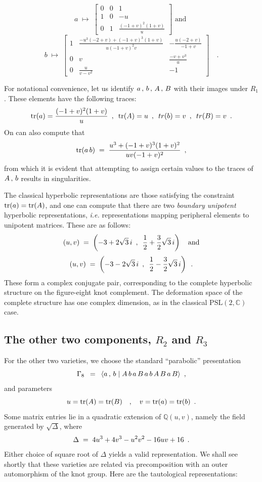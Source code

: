 \[
a \;\mapsto\; \left[\begin{array}{ccc}0&0&1\\1&0&-u\\0&1&\frac{(-1+v)^2(1+v)}{u}\end{array}\right] \textrm{ and }\]
\[b\;\mapsto\; \left[\begin{array}{ccc}1&
\frac{-u^3(-2+v)+(-1+v)^3(1+v)}{u(-1+v)^2v}&
-\frac{u(-2+v)}{-1+v}\\
0&v&
\frac{-v+v^3}{u}\\
0&
\frac{u}{v-v^2}&
-1\end{array}\right] \quad. \]

For notational convenience, let us identify $a \,,\, b \,,\, A \,,\, B$ with their images
under $R_1$.  These elements have the following traces:
\[ \mathrm{tr}(a) = \frac{(-1+v)^2(1+v)}{u} \hspace{.5em},\hspace{.5em} \mathrm{tr}(A) = u \hspace{.5em},\hspace{.5em} tr(b) = v \hspace{.5em},\hspace{.5em} tr(B) = v \hspace{.5em}.\]
On can also compute that
\[ \mathrm{tr}(a\,b) \;=\; \frac{u^3 + (-1 + v)^3(1 + v)^2}{uv(-1 + v)^2} \hspace{.5em},\]
from which it is evident that attempting to assign certain values to the traces
of $A \,,\, b$ results in singularities.
\vv

The classical hyperbolic representations are those satisfying the
constraint $\mathrm{tr}(a) = \mathrm{tr}(A)$, and one can compute that there are two {\it boundary unipotent}
hyperbolic representations, {\it i.e.} representations mapping peripheral elements
to unipotent matrices.  These are as follows:
\[ (u , v) \;=\; \left(-3 + 2\sqrt{3}\,i \hspace{.5em},\hspace{.5em} \frac{1}{2} + \frac{3}{2}\sqrt{3}\,i\right) \quad\textrm{and}\]
\[   (u , v) \;=\; \left(-3 - 2\sqrt{3}\,i \hspace{.5em},\hspace{.5em} \frac{1}{2} - \frac{3}{2}\sqrt{3}\,i\right) \hspace{.5em}.\]
These form a complex conjugate pair, corresponding to the complete hyperbolic structure
on the figure-eight knot complement.  The deformation space of the complete structure
has one complex dimension, as in the classical $\mathrm{PSL(2,\mathbb C)}$ case.


\subsection{The other two components, $R_2$ and $R_3$}\label{ss:R_2-R_3}

For the other two varieties, we choose the standard ``parabolic'' presentation
\[ \Gamma_8 \hspace{.5em}=\hspace{.5em} \langle a \,,\, b \;|\; A\,b\,a\,B\,a\,b\,A\,B\,a\,B \rangle \hspace{.5em},\]
and parameters
\[ u = \mathrm{tr}(A) = \mathrm{tr}(B) \quad,\quad v = \mathrm{tr}(a) = \mathrm{tr}(b) \hspace{.5em}.\]
Some matrix entries
lie in a quadratic extension of $\mathbb Q(u,v)$, namely the field generated by
$\sqrt{\Delta}$, where
\[ \Delta \;=\; 4 u^3 + 4 v^3 - u^2 v^2 - 16 u v + 16 \hspace{.5em}.\]
Either choice of square root of $\Delta$ yields a valid representation.
We shall see shortly that these varieties are related via precomposition with an
outer automorphism of the knot group.  Here are the tautological representations:
\vvv

